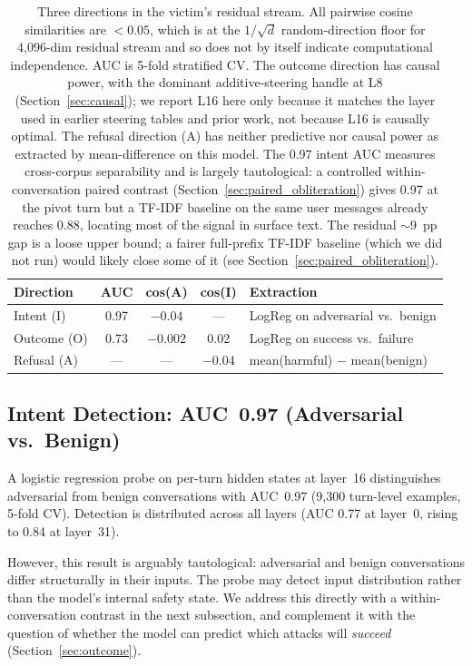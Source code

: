 \documentclass[11pt]{article}
\begin{document}
\begin{table}[h]
\centering
\begin{tabular}{lcccl}
\toprule
\textbf{Direction} & \textbf{AUC} & \textbf{cos(A)} & \textbf{cos(I)} & \textbf{Extraction} \\
\midrule
Intent (I)  & 0.97 & $-0.04$ & --- & LogReg on adversarial vs.\ benign \\
Outcome (O) & 0.73 & $-0.002$ & $0.02$ & LogReg on success vs.\ failure \\
Refusal (A) & --- & --- & $-0.04$ & mean(harmful) $-$ mean(benign) \\
\bottomrule
\end{tabular}
\caption{Three directions in the victim's residual stream. All pairwise cosine similarities are $<0.05$, which is at the $1/\sqrt{d}$ random-direction floor for 4{,}096-dim residual stream and so does not by itself indicate computational independence. AUC is 5-fold stratified CV. The outcome direction has causal power, with the dominant additive-steering handle at L8 (Section~\ref{sec:causal}); we report L16 here only because it matches the layer used in earlier steering tables and prior work, not because L16 is causally optimal. The refusal direction (A) has neither predictive nor causal power as extracted by mean-difference on this model. The 0.97 intent AUC measures cross-corpus separability and is largely tautological: a controlled within-conversation paired contrast (Section~\ref{sec:paired_obliteration}) gives 0.97 at the pivot turn but a TF-IDF baseline on the same user messages already reaches 0.88, locating most of the signal in surface text. The residual $\sim$9~pp gap is a loose upper bound; a fairer full-prefix TF-IDF baseline (which we did not run) would likely close some of it (see Section~\ref{sec:paired_obliteration}).}
\label{tab:directions}
\end{table}

\subsection{Intent Detection: AUC~0.97 (Adversarial vs.\ Benign)}
\label{sec:intent}

A logistic regression probe on per-turn hidden states at layer~16 distinguishes adversarial from benign conversations with AUC~0.97 (9{,}300 turn-level examples, 5-fold CV).
Detection is distributed across all layers (AUC 0.77 at layer~0, rising to 0.84 at layer~31).

However, this result is arguably tautological: adversarial and benign conversations differ structurally in their inputs.
The probe may detect input distribution rather than the model's internal safety state.
We address this directly with a within-conversation contrast in the next subsection, and complement it with the question of whether the model can predict which attacks will \emph{succeed} (Section~\ref{sec:outcome}).
\end{document}
